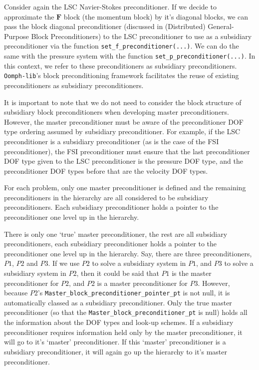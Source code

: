 Consider again the LSC Navier-Stokes preconditioner. If we decide to approximate
the $\mathbf{F}$ block (the momentum block) by it's diagonal blocks, we can 
pass the block diagonal preconditioner (discussed in (Distributed) 
General-Purpose Block Preconditioners) to the LSC preconditioner to use as a 
subsidiary preconditioner via the function 
\texttt{set\_\allowbreak f\_\allowbreak preconditioner(...)}. We can do the 
same with the pressure system with the function 
\texttt{set\_\allowbreak p\_\allowbreak preconditioner(...)}. In this context, 
we refer to these preconditioners as subsidiary preconditioners. 
\texttt{Oomph-lib}'s block preconditioning framework facilitates the reuse of 
existing preconditioners as subsidiary preconditioners.

It is important to note that we do not need to consider the block structure of 
subsidiary block preconditioners when developing master preconditioners. 
However, the master preconditioner must be aware of the preconditioner DOF type 
ordering assumed by subsidiary preconditioner. For example, if the LSC 
preconditioner is a subsidiary preconditioner (as is the case of the FSI 
preconditioner), the FSI preconditioner must ensure that the last preconditioner 
DOF type given to the LSC preconditioner is the pressure DOF type, and the 
preconditioner DOF types before that are the velocity DOF types.

For each problem, only one master preconditioner is defined and the remaining preconditioners in the hierarchy are all considered to be subsidiary preconditioners. Each subsidiary preconditioner holds a pointer to the preconditioner one level up in the hierarchy.

There is only one `true' master preconditioner, the rest are all subsidiary 
preconditioners, each subsidiary preconditioner holds a pointer to the 
preconditioner one level up in the hierarchy. Say, there are three 
preconditioners, $P1$, $P2$ and $P3$. If we use $P2$ to solve a subsidiary 
system in $P1$, and $P3$ to solve a subsidiary system in $P2$, then it could be 
said that $P1$ is the master preconditioner for $P2$, and $P2$ is a master 
preconditioner for $P3$. However, because $P2$'s 
\texttt{Master\_\allowbreak block\_\allowbreak preconditioner\_\allowbreak pointer\_\allowbreak pt} is not null, it is automatically 
classed as a subsidiary preconditioner. Only the true master preconditioner (so 
that the \texttt{Master\_\allowbreak block\_\allowbreak preconditioner\_\allowbreak pt} is null) holds all the information
about the DOF types and look-up schemes. If a subsidiary preconditioner requires 
information held only by the master preconditioner, it will go to it's `master'
preconditioner. If this `master' preconditioner is a subsidiary preconditioner, 
it will again go up the hierarchy to it's master preconditioner.

